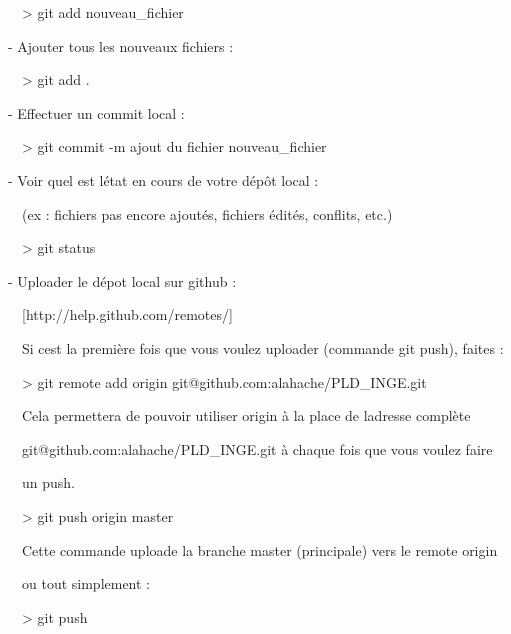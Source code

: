 \documentclass{mise_en_page}
\begin{document}
\ \ {\textgreater} git add nouveau\_fichier







{}- Ajouter tous les nouveaux fichiers :

\ \ {\textgreater} git add .







{}- Effectuer un commit local :

\ \ {\textgreater} git commit -m {\textquotedbl}ajout du fichier
nouveau\_fichier{\textquotedbl}







{}- Voir quel est l{\textquotesingle}état en cours de votre dépôt local
:

\ \ (ex : fichiers pas encore ajoutés, fichiers édités, conflits, etc.)

\ \ {\textgreater} git status







{}- Uploader le dépot local sur github :

\ \ [http://help.github.com/remotes/]

\ \ Si c{\textquotesingle}est la première fois que vous voulez uploader
(commande git push), faites :

\ \ {\textgreater} git remote add origin
git@github.com:alahache/PLD\_INGE.git




\ \ Cela permettera de pouvoir utiliser
{\textquotedbl}origin{\textquotedbl} à la place de
l{\textquotesingle}adresse complète

\ \ {\textquotedbl}git@github.com:alahache/PLD\_INGE.git{\textquotedbl}
à chaque fois que vous voulez faire

\ \ un push.




\ \ {\textgreater} git push origin master

\ \ Cette commande uploade la branche
{\textquotedbl}master{\textquotedbl} (principale) vers le remote
{\textquotedbl}origin{\textquotedbl}




\ \ ou tout simplement :

\ \ {\textgreater} git push
\end{document}

